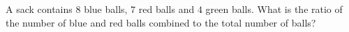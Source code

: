 A sack contains $8$ blue balls, $7$ red balls and $4$ green balls. What is the ratio of the number of blue and red balls combined to the total number of balls?

